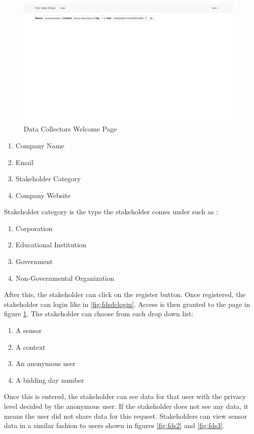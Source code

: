 \begin{figure}[ht!]
\centering
\includegraphics[width=\textwidth,keepaspectratio]{./images/fds_dc_welcome}
\caption{Data Collectors Welcome Page \label{fig:fds5}}
\end{figure}



\begin{enumerate}
    \item Company Name
    \item Email
    \item Stakeholder Category
    \item Company Website
\end{enumerate}

Stakeholder category is the type the stakeholder comes under such as :

\begin{enumerate}
    \item Corporation
    \item Educational Institution
    \item Government
    \item Non-Governmental Organization
\end{enumerate}


After this, the stakeholder can click on the register button. Once registered, the stakeholder can login like in \ref{fig:fdsdclogin}. Access is then granted to the page in figure \ref{fig:fds5}. The stakeholder can choose from each drop down list:
\begin{enumerate}
    \item A sensor
    \item A context
    \item An anonymous user
    \item A bidding day number
\end{enumerate}

Once this is entered, the stakeholder can see data for that user with the privacy level decided by the anonymous user. If the stakeholder does not see any data, it means the user did not share data for this request. Stakeholders can view sensor data in a similar fashion to users shown in figures \ref{fig:fds2} and \ref{fig:fds3}.



